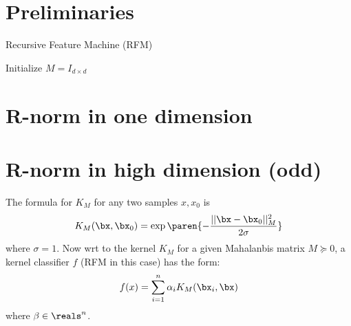 \section{Preliminaries}

\begin{algorithm}
\caption{Recursive Feature Machine (RFM)}
 \tcp{\textcolor{blue}{Training data: $(X, y)$, kernel function: $K_M$, and number of iterations: $T$}}
 \tcp{\textcolor{blue}{Solution to kernel regression: $\beta$, and feature matrix: $M$}}
\nl Initialize $M = I_{d \times d}$\; \tcp{\textcolor{blue}{Identity matrix of dimension $d \times d$}}

\end{algorithm}


\section{R-norm in one dimension}


\section{R-norm in high dimension (odd)}


The formula for $K_M$ for any two samples $x,x_0$ is
\begin{align*}
    K_M(\bx,\bx_0) = \exp\paren{-\frac{||\bx - \bx_0||_M^2}{2\sigma}}
\end{align*}
where $\sigma = 1$. Now wrt to the kernel $K_M$ for a given Mahalanbis matrix $M \succeq 0$, a kernel classifier $f$ (RFM in this case) has the form:
\begin{align*}
    f(x) = \sum_{i=1}^n \alpha_i K_M(\bx_i, \bx)
\end{align*}
where $\beta \in \reals^n$.



